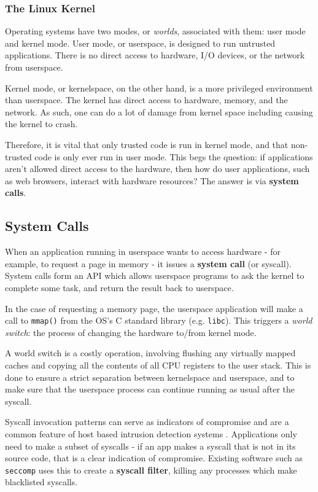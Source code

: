 
\subsubsection{The Linux Kernel}
Operating systems have two modes, or \textit{worlds}, associated with them: user
mode and kernel mode. User mode, or userspace, is designed to run untrusted 
applications. There is no direct access to hardware, I/O devices, or the 
network from userspace.

Kernel mode, or kernelspace, on the other hand, is a more privileged environment
than userspace. The kernel has direct access to hardware, memory, and the
network. As such, one can do a lot of damage from kernel space including causing
the kernel to crash.

Therefore, it is vital that only trusted code is run in kernel mode, and that
non-trusted code is only ever run in user mode. This begs the question: if
applications aren't allowed direct access to the hardware, then how do user
applications, such as web browsers, interact with hardware resources? The answer
is via \textbf{system calls}.

\subsection{System Calls}

When an application running in userspace wants to access hardware - for example,
to request a page in memory - it issues a \textbf{system call} (or syscall). System calls
form an \ac{API} which allows userspace programs to ask the kernel to complete some
task, and return the result back to userspace.

In the case of requesting a memory page, the userspace application will make a
call to \texttt{mmap()} from the \ac{OS}'s C standard library (e.g. \texttt{libc}).
This triggers a \textit{world switch}: the process of changing the hardware
to/from kernel mode.

A world switch is a costly operation, involving flushing any virtually mapped
caches and copying all the contents of all \ac{CPU} registers to the user stack. This
is done to ensure a strict separation between kernelspace and userspace, and to
make sure that the userspace process can continue running as usual after the
syscall.

Syscall invocation patterns can serve as indicators of compromise
and are a common feature of host based intrusion detection systems \cite{10.1145/3214304}. 
Applications only need to make a subset of syscalls
- if an app makes a syscall that is not in its source code, that is a clear
indication of compromise. Existing software such as \texttt{seccomp} uses this
to create a \textbf{syscall filter}, killing any processes which make
blacklisted syscalls. 

